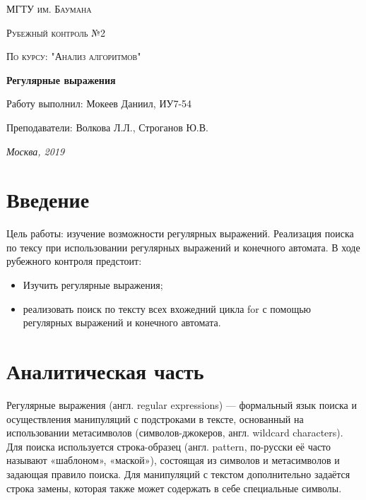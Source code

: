 \documentclass[12pt]{report}
\begin{document}
\begin{titlepage}
	\centering
	{\scshape\LARGE МГТУ им. Баумана \par}
	\vspace{3cm}
	{\scshape\Large Рубежный контроль №2\par}
	\vspace{0.5cm}	
	{\scshape\Large По курсу: "Анализ алгоритмов"\par}
	\vspace{1.5cm}
	{\huge\bfseries Регулярные выражения \par}
	\vspace{2cm}
	\Large Работу выполнил: Мокеев Даниил, ИУ7-54\par
	\vspace{0.5cm}
	\Large Преподаватели:  Волкова Л.Л., Строганов Ю.В.\par

	\vfill
	\large \textit {Москва, 2019} \par
\end{titlepage}

\tableofcontents

\newpage
\chapter*{Введение}

Цель работы: изучение возможности регулярных выражений. Реализация поиска по тексу при использовании регулярных выражений и конечного автомата.
В ходе рубежного контроля предстоит:
\begin{itemize}
	\item Изучить регулярные выражения; 
	\item реализовать поиск по тексту всех вхожедний цикла for с помощью регулярных выражений и конечного автомата.
\end{itemize}

\chapter{Аналитическая часть}
Регулярные выражения (англ. regular expressions) — формальный язык поиска и осуществления манипуляций с подстроками в тексте, основанный на использовании метасимволов (символов-джокеров, англ. wildcard characters). Для поиска используется строка-образец (англ. pattern, по-русски её часто называют «шаблоном», «маской»), состоящая из символов и метасимволов и задающая правило поиска. Для манипуляций с текстом дополнительно задаётся строка замены, которая также может содержать в себе специальные символы.
\end{document}
